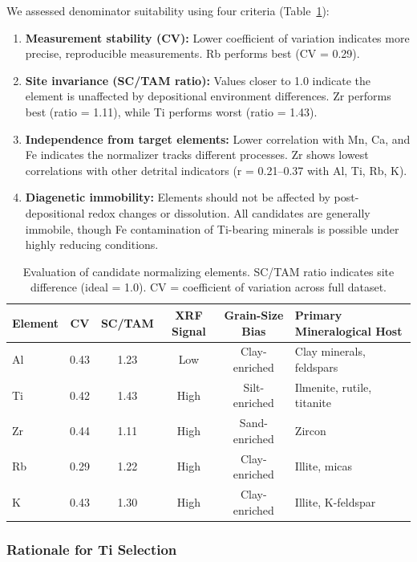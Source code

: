 We assessed denominator suitability using four criteria (Table~\ref{tab:normalizers}):

\begin{enumerate}
\item \textbf{Measurement stability (CV):} Lower coefficient of variation indicates more precise, reproducible measurements. Rb performs best (CV = 0.29).

\item \textbf{Site invariance (SC/TAM ratio):} Values closer to 1.0 indicate the element is unaffected by depositional environment differences. Zr performs best (ratio = 1.11), while Ti performs worst (ratio = 1.43).

\item \textbf{Independence from target elements:} Lower correlation with Mn, Ca, and Fe indicates the normalizer tracks different processes. Zr shows lowest correlations with other detrital indicators (r = 0.21--0.37 with Al, Ti, Rb, K).

\item \textbf{Diagenetic immobility:} Elements should not be affected by post-depositional redox changes or dissolution. All candidates are generally immobile, though Fe contamination of Ti-bearing minerals is possible under highly reducing conditions.
\end{enumerate}

\begin{table}[htbp]
\centering
\caption{Evaluation of candidate normalizing elements. SC/TAM ratio indicates site difference (ideal = 1.0). CV = coefficient of variation across full dataset.}
\label{tab:normalizers}
\small
\begin{tabular}{lccccp{4cm}}
\toprule
Element & CV & SC/TAM & XRF Signal & Grain-Size Bias & Primary Mineralogical Host \\
\midrule
Al & 0.43 & 1.23 & Low & Clay-enriched & Clay minerals, feldspars \\
Ti & 0.42 & 1.43 & High & Silt-enriched & Ilmenite, rutile, titanite \\
Zr & 0.44 & 1.11 & High & Sand-enriched & Zircon \\
Rb & 0.29 & 1.22 & High & Clay-enriched & Illite, micas \\
K & 0.43 & 1.30 & High & Clay-enriched & Illite, K-feldspar \\
\bottomrule
\end{tabular}
\end{table}

\subsubsection{Rationale for Ti Selection}

